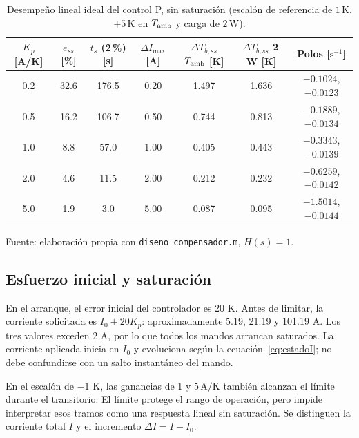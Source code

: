 \documentclass[journal,twocolumn]{IEEEtran}
\begin{document}
\begin{table}[!tbp]\centering
\caption{Desempeño lineal ideal del control P, sin saturación (escalón de referencia de $1\,\mathrm K$, $+5\,\mathrm K$ en $T_{\rm amb}$ y carga de $2\,\mathrm W$).}\label{tab:P_analitico}
{\footnotesize\setlength{\tabcolsep}{3pt}\renewcommand{\arraystretch}{1.15}\setlength{\tabcolsep}{2.2pt}
\begin{tabular}{@{}ccccccc@{}}\toprule
\shortstack{$K_p$\\{[A/K]}} & \shortstack{$e_{ss}$\\{[\%]}} & \shortstack{$t_s$ (2\,\%)\\{[s]}} & \shortstack{$\Delta I_{\max}$\\{[A]}} & \shortstack{$\Delta T_{b,ss}$\\$T_{\rm amb}$ [K]} & \shortstack{$\Delta T_{b,ss}$\\2\,W [K]} & \shortstack{Polos\\{[$\mathrm{s^{-1}}$]}}\\\midrule
0.2 & 32.6 & 176.5 & 0.20 & 1.497 & 1.636 & $-0.1024$, $-0.0123$\\
0.5 & 16.2 & 106.7 & 0.50 & 0.744 & 0.813 & $-0.1889$, $-0.0134$\\
1.0 & 8.8 & 57.0 & 1.00 & 0.405 & 0.443 & $-0.3343$, $-0.0139$\\
2.0 & 4.6 & 11.5 & 2.00 & 0.212 & 0.232 & $-0.6259$, $-0.0142$\\
5.0 & 1.9 & 3.0 & 5.00 & 0.087 & 0.095 & $-1.5014$, $-0.0144$\\\bottomrule
\end{tabular}}
\par\smallskip\footnotesize Fuente: elaboración propia con \texttt{diseno\_compensador.m}, $H(s)=1$.
\end{table}


\subsection{Esfuerzo inicial y saturación}
En el arranque, el error inicial del controlador es 20 K. Antes de limitar, la corriente solicitada es $I_0+20K_p$: aproximadamente 5.19, 21.19 y 101.19 A. Los tres valores exceden 2 A, por lo que todos los mandos arrancan saturados. La corriente aplicada inicia en $I_0$ y evoluciona según la ecuación~\eqref{eq:estadoI}; no debe confundirse con un salto instantáneo del mando.

En el escalón de $-1$ K, las ganancias de 1 y $5\,\mathrm{A/K}$ también alcanzan el límite durante el transitorio. El límite protege el rango de operación, pero impide interpretar esos tramos como una respuesta lineal sin saturación. Se distinguen la corriente total $I$ y el incremento $\Delta I=I-I_0$.
\end{document}
